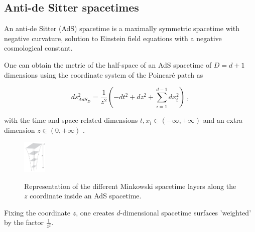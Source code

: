 \documentclass[twocolumn]{revtex4}
\providecommand{\eq}[2]{
    \begin{equation}
        #2
    \label{eq:#1}
    \end{equation}
}
\begin{document}
\newpage

\subsection{Anti-de Sitter spacetimes} \label{ss:AdS}

An anti-de Sitter (AdS) spacetime is a maximally symmetric spacetime with negative curvature, solution to Einstein field equations with a negative cosmological constant.



One can obtain the metric of the half-space of an AdS spacetime of $D=d+1$ dimensions using the coordinate system of the Poincaré patch as
\eq{AdS_PP-metric}{
    ds_{AdS_D}^2 = \frac{1}{z^2} \left( -dt^2 + dz^2 + \sum_{i=1}^{d-1} dx_i^2 \right) \ ,
}
with the time and space-related dimensions $t , x_i \in (-\infty,+\infty)$ and an extra dimension $z \in (0,+\infty)$ \cite{kaplan_lectures_nodate}.

\begin{figure}
    \centering
    \includegraphics[width=0.1\textwidth]{../Imatges/Extern/Captura_Superficies_z.png}
    \label{fig:AdS_z-surfaces}
    \caption{Representation of the different Minkowski spacetime layers along the $z$ coordinate inside an AdS spacetime.}
\end{figure}

Fixing the coordinate $z$, one creates $d$-dimensional spacetime surfaces 'weighted' by the factor $\frac{1}{z^2}$.
\end{document}
